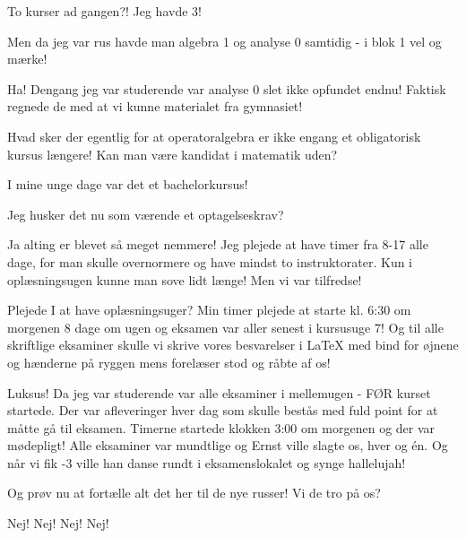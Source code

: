 \documentclass[a4paper,11pt]{article}
\begin{document}
\begin{sketch}
 To kurser ad gangen?! Jeg havde 3!

 Men da jeg var rus havde man algebra 1 og analyse 0 samtidig - i blok 1 vel og mærke!

 Ha! Dengang jeg var studerende var analyse 0 slet ikke opfundet endnu! Faktisk regnede de med at vi kunne materialet fra gymnasiet!

 Hvad sker der egentlig for at operatoralgebra er ikke engang et obligatorisk kursus længere! Kan man være kandidat i matematik uden?

 I mine unge dage var det et bachelorkursus!

 Jeg husker det nu som værende et optagelseskrav?

 Ja alting er blevet så meget nemmere! Jeg plejede at have timer fra 8-17 alle dage, for man skulle overnormere og have mindst to instruktorater. Kun i oplæsningsugen kunne man sove lidt længe! Men vi var tilfredse!


 Plejede I at have oplæsningsuger? Min timer plejede at starte kl. 6:30 om morgenen 8 dage om ugen og eksamen var aller senest i kursusuge 7! Og til alle skriftlige eksaminer skulle vi skrive vores besvarelser i LaTeX med bind for øjnene og hænderne på ryggen mens forelæser stod og råbte af os!

 Luksus! Da jeg var studerende var alle eksaminer i mellemugen - FØR kurset startede. Der var afleveringer hver dag som skulle bestås med fuld point for at måtte gå til eksamen. Timerne startede klokken 3:00 om morgenen og der var mødepligt! Alle eksaminer var mundtlige og Ernst ville slagte os, hver og én. Og når vi fik -3 ville han danse rundt i eksamenslokalet og synge hallelujah!


 Og prøv nu at fortælle alt det her til de nye russer! Vi de tro på os?

 Nej! Nej! Nej! Nej!
\end{sketch}
\end{document}
